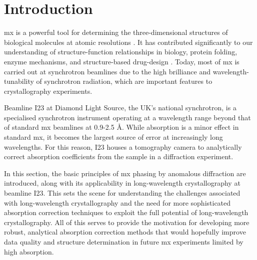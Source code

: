 \section{Introduction}


\ac{mx} is a powerful tool for determining the three-dimensional structures of biological molecules at atomic resolutions \cite{Gorrec2021}. It has contributed significantly to our understanding of structure-function relationships in biology, protein folding, enzyme mechanisms, and structure-based drug-design \cite{Foerster2019}. Today, most of \ac{mx} is carried out at synchrotron beamlines due to the high brilliance and wavelength-tunability of synchrotron radiation, which are important features to crystallography experiments.

Beamline I23 at Diamond Light Source, the UK's national synchrotron, is a specialised synchrotron instrument operating at a wavelength range beyond that of standard \ac{mx} beamlines at 0.9-2.5 Å. While absorption is a minor effect in standard \ac{mx}, it becomes the largest source of error at increasingly long wavelengths. For this reason, I23 houses a tomography camera to analytically correct absorption coefficients from the sample in a diffraction experiment.


In this section, the basic principles of \ac{mx} phasing by anomalous diffraction are introduced, along with its applicability in long-wavelength crystallography at beamline I23. This sets the scene for understanding the challenges associated with long-wavelength crystallography and the need for more sophisticated absorption correction techniques to exploit the full potential of long-wavelength crystallography. %
All of this serves to provide the motivation for developing more robust, analytical absorption correction methods that would hopefully improve data quality and structure determination in future \ac{mx} experiments limited by high absorption.

